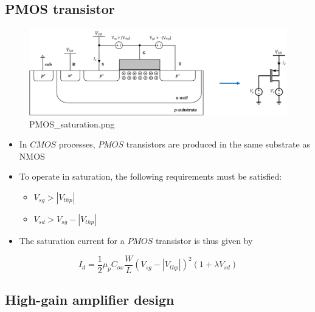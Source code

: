 \documentclass[11pt]{article}
\providecommand{\tightlist}{%
      \setlength{\itemsep}{0pt}\setlength{\parskip}{0pt}}
\begin{document}
    \hypertarget{pmos-transistor}{%
\subsection{PMOS transistor}\label{pmos-transistor}}

    \begin{figure}
\centering
\includegraphics{PMOS_saturation.png}
\caption{PMOS\_saturation.png}
\end{figure}

    \begin{itemize}
\tightlist
\item
  In \(CMOS\) processes, \(PMOS\) transistors are produced in the same
  substrate as NMOS
\item
  To operate in saturation, the following requirements must be
  satisfied:

  \begin{itemize}
  \tightlist
  \item
    \(V_{sg} > |V_{thp}|\)
  \item
    \(V_{sd} > V_{sg} - |V_{thp}|\)
  \end{itemize}
\item
  The saturation current for a \(PMOS\) transistor is thus given by
\end{itemize}

\begin{equation}
I_d = \dfrac{1}{2}\mu_p C_{ox} \dfrac{W}{L} (V_{sg} - |V_{thp}|)^2(1+\lambda V_{sd})
\end{equation}

    \hypertarget{high-gain-amplifier-design}{%
\subsection{High-gain amplifier
design}\label{high-gain-amplifier-design}}
\end{document}
